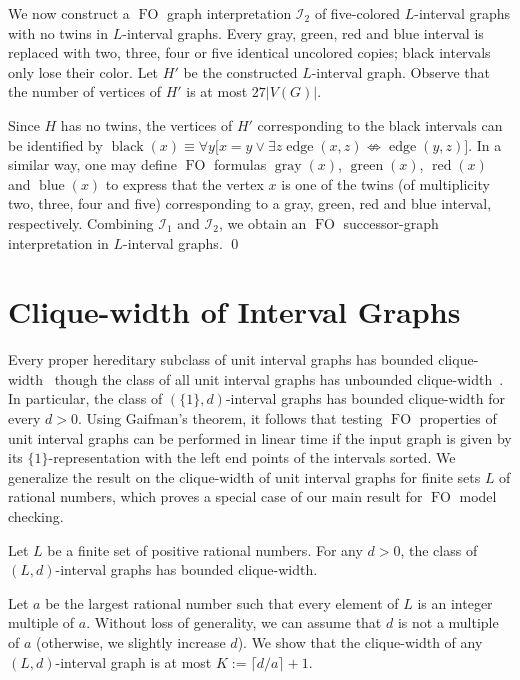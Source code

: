 \documentclass{CSML}
\def\prebox#1{\mathop{\mbox{#1}}}
\newcommand{\FO}{\ensuremath{\operatorname{FO}}\xspace}
\newcommand{\cI}{\mathcal{I}}
\theoremstyle{plain}\newtheorem{claim}[thm]{Claim}
\begin{document}
We now construct a \FO graph interpretation $\cI_2$ of five-colored $L$-interval graphs
with no twins in $L$-interval graphs.
Every gray, green, red and blue interval is replaced with two, three, four or five
identical uncolored copies; black intervals only lose their color.
Let $H'$ be the constructed $L$-interval graph.
Observe that the number of vertices of $H'$ is at most $27|V(G)|$.

Since $H$ has no twins, the vertices of $H'$ corresponding to the black intervals can be identified
by
$\prebox{black}(x)\equiv \forall y\big[
 x=y\vee \exists z \prebox{edge}(x,z)\not\Leftrightarrow\prebox{edge}(y,z)
\big]$.
In a similar way, one may define \FO formulas $\prebox{gray}(x)$, $\prebox{green}(x)$, $\prebox{red}(x)$ and $\prebox{blue}(x)$
to express that the vertex $x$ is one of the twins (of multiplicity two, three, four and five) corresponding to a gray, green, red and blue interval, respectively.
Combining $\cI_1$ and $\cI_2$, we obtain an \FO successor-graph interpretation in $L$-interval graphs.
\qed


\section{Clique-width of Interval Graphs}
\label{sec:clique}


Every proper hereditary subclass of unit interval graphs has bounded clique-width~\cite{loz08}
though the class of all unit interval graphs has unbounded clique-width~\cite{GR00}.
In particular, the class of $(\{1\},d)$-interval graphs has bounded
clique-width for every $d>0$. Using Gaifman's theorem, it follows that
testing \FO properties of unit interval graphs can be performed in linear time
if the input graph is given by its $\{1\}$-representation
with the left end points of the intervals sorted.
We generalize the result on the clique-width of unit interval graphs for finite sets $L$ of rational numbers,
which proves a special case of our main result for \FO model checking.

\begin{prop}
\label{prop:Ld-boundedcw}
Let $L$ be a finite set of positive rational numbers.
For any $d>0$, the class of $(L,d)$-interval graphs has bounded clique-width.
\end{prop}

\proof
Let $a$ be the largest rational number such that every element of $L$
is an integer multiple of $a$. Without loss of generality, we can assume
that $d$ is not a multiple of $a$ (otherwise, we slightly increase $d$).
We show that the clique-width of any
$(L,d)$-interval graph is at most $K:=\lceil d/a\rceil+1$.
\end{document}
